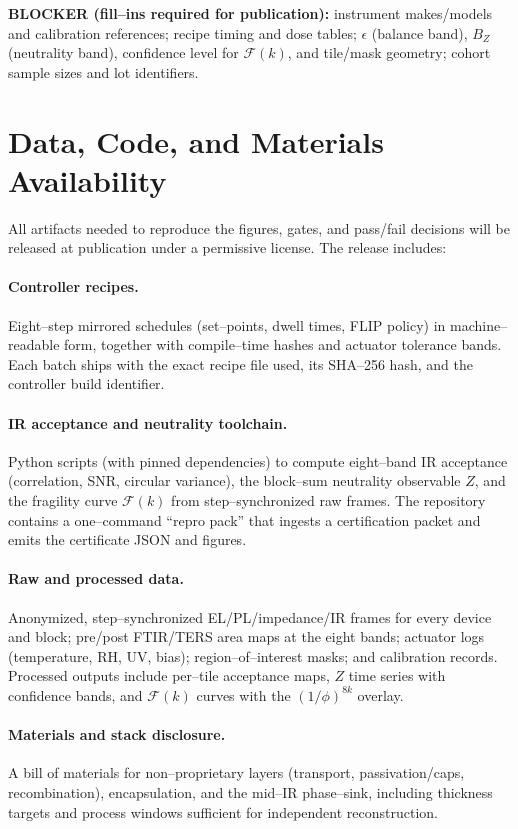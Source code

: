 \documentclass[12pt]{article}
\begin{document}
\medskip
\noindent\textbf{BLOCKER (fill–ins required for publication):} instrument makes/models and calibration references; recipe timing and dose tables; $\epsilon$ (balance band), $B_Z$ (neutrality band), confidence level for $\mathcal{F}(k)$, and tile/mask geometry; cohort sample sizes and lot identifiers.

\section{Data, Code, and Materials Availability}

All artifacts needed to reproduce the figures, gates, and pass/fail decisions will be released at publication under a permissive license. The release includes:

\paragraph{Controller recipes.}
Eight–step mirrored schedules (set–points, dwell times, FLIP policy) in machine–readable form, together with compile–time hashes and actuator tolerance bands. Each batch ships with the exact recipe file used, its SHA–256 hash, and the controller build identifier.

\paragraph{IR acceptance and neutrality toolchain.}
Python scripts (with pinned dependencies) to compute eight–band IR acceptance (correlation, SNR, circular variance), the block–sum neutrality observable $Z$, and the fragility curve $\mathcal{F}(k)$ from step–synchronized raw frames. The repository contains a one–command “repro pack” that ingests a certification packet and emits the certificate JSON and figures.

\paragraph{Raw and processed data.}
Anonymized, step–synchronized EL/PL/impedance/IR frames for every device and block; pre/post FTIR/TERS area maps at the eight bands; actuator logs (temperature, RH, UV, bias); region–of–interest masks; and calibration records. Processed outputs include per–tile acceptance maps, $Z$ time series with confidence bands, and $\mathcal{F}(k)$ curves with the $(1/\phi)^{8k}$ overlay.

\paragraph{Materials and stack disclosure.}
A bill of materials for non–proprietary layers (transport, passivation/caps, recombination), encapsulation, and the mid–IR phase–sink, including thickness targets and process windows sufficient for independent reconstruction.
\end{document}
